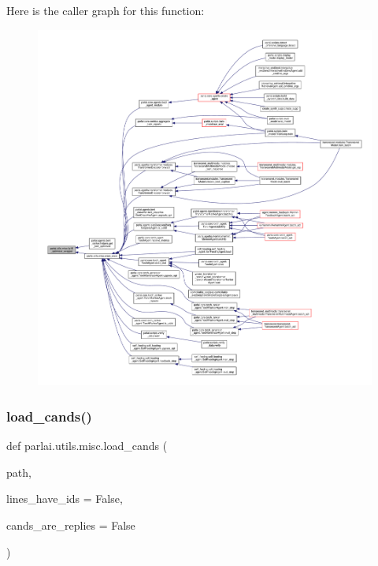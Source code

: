 Here is the caller graph for this function\+:
\nopagebreak
\begin{figure}[H]
\begin{center}
\leavevmode
\includegraphics[width=350pt]{namespaceparlai_1_1utils_1_1misc_a7836ac7469dc5744e0ad9e5e54da2396_icgraph}
\end{center}
\end{figure}
\mbox{\label{namespaceparlai_1_1utils_1_1misc_ad935ab0a9d49b897c5e3efdbe1c46c4d}} 
\subsubsection{\texorpdfstring{load\+\_\+cands()}{load\_cands()}}
{\footnotesize\ttfamily def parlai.\+utils.\+misc.\+load\+\_\+cands (\begin{DoxyParamCaption}\item[{}]{path,  }\item[{}]{lines\+\_\+have\+\_\+ids = {\ttfamily False},  }\item[{}]{cands\+\_\+are\+\_\+replies = {\ttfamily False} }\end{DoxyParamCaption})}

